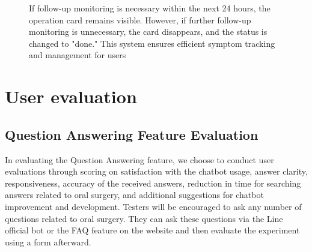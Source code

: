 \documentclass[12pt,oneside,openright,a4paper]{cpe-english-project}
\begin{document}
\begin{figure}[H]
\begin{justify}
                \qquad If follow-up monitoring is necessary within the next 24 hours, the operation card remains visible. However, if further follow-up monitoring is unnecessary, the card disappears, and the status is changed to "done." This system ensures efficient symptom tracking and management for users\par
              \end{justify}
            \end{figure}
    \section{User evaluation}
      \subsection{Question Answering Feature Evaluation}
        \qquad In evaluating the Question Answering feature, we choose to conduct user evaluations through scoring on satisfaction with the chatbot usage, answer clarity, responsiveness, accuracy of the received answers, reduction in time for searching answers related to oral surgery, and additional suggestions for chatbot improvement and development. Testers will be encouraged to ask any number of questions related to oral surgery. They can ask these questions via the Line official bot or the FAQ feature on the website and then evaluate the experiment using a form afterward.\par
\end{document}
